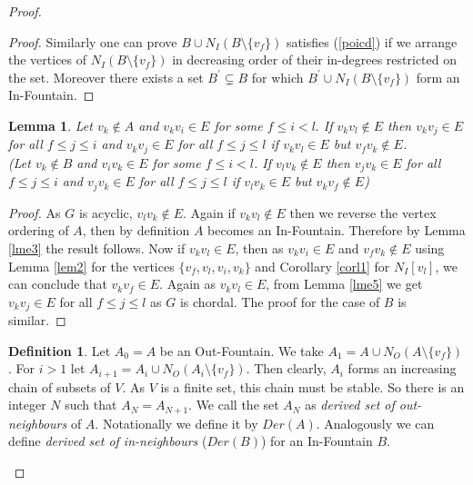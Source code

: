 \documentclass{article}
\newtheorem{lem}[thm]{Lemma}
\theoremstyle{definition}
\newtheorem{defn}[thm]{Definition}
\numberwithin{equation}{section}
\begin{document}
\begin{proof}
\begin{proof}
\noindent Similarly one can prove $B\cup N_{I}(B\setminus \{v_{f}\})$ satisfies (\ref{poicd}) if we arrange the vertices of $N_{I}(B\setminus \{v_{f}\})$ in decreasing order of their in-degrees restricted on the set. Moreover there exists a set $B^{'}\subsetneq B$ for which $B^{'}\cup N_{I}(B\setminus \{v_{f}\})$ form an In-Fountain. 
\end{proof}




\begin{lem}\label{lme7}
Let $v_{k}\notin A$ and $v_{k}v_{i}\in E$ for some $f\leq i<l.$ If $v_{k}v_{l}\notin E$ then $v_{k}v_{j}\in E$ for all $f\leq j\leq i$ and $v_{k}v_{j}\in E$ for all $f\leq j\leq l$ if $v_{k}v_{l}\in E$ but $v_{f}v_{k}\notin E$. \\
\vspace{0.2em}
\noindent (Let $v_{k}\notin B$ and $v_{i}v_{k}\in E$ for some $f\leq i<l$. If $v_{l}v_{k}\notin E$ then $v_{j}v_{k}\in E$ for all $f\leq j \leq i$ and $v_{j}v_{k}\in E$ for all $f\leq j \leq l$ if $v_{l}v_{k}\in E$ but $v_{k}v_{f}\notin E$)
\end{lem}


\begin{proof}
As $G$ is acyclic, $v_{l}v_{k}\notin E$. Again if $v_{k}v_{l}\notin E$ then 
we reverse the vertex ordering of $A$, then by definition $A$ becomes an In-Fountain. Therefore by Lemma \ref{lme3} the result follows.
Now if $v_{k}v_{l}\in E$, then as $v_{k}v_{i}\in E$ and $v_{f}v_{k}\notin E$ using Lemma \ref{lem2} for the vertices $\{v_{f},v_{l},v_{i},v_{k}\}$
and Corollary \ref{corl1} for $N_{I}[v_{l}]$, we can conclude that $v_{k}v_{f}\in E$. Again as $v_{k}v_{l}\in E$, from Lemma \ref{lme5} we get $v_{k}v_{j}\in E$ for all $f\leq j\leq l$ as $G$ is chordal.  The proof for the case of $B$ is similar.
\end{proof}



\begin{defn}
Let $A_{0}=A$ be an Out-Fountain. We take $A_{1}= A\cup N_{O}(A\setminus \{v_{f}\})$. For $i>1$ let $A_{i+1}= A_{i}\cup N_{O}(A_{i}\setminus \{v_{f}\})$.
Then clearly, $A_{i}$ forms an increasing chain of subsets of $V$. As $V$ is a finite set, this chain must be stable. So there is an integer $N$ such that $A_{N}=A_{N+1}$. We call the set $A_{N}$ as {\em derived set of out-neighbours}  of $A$. Notationally we define it by $Der(A)$. Analogously we can define {\em derived set of in-neighbours} ($Der(B)$) for an In-Fountain $B$.
\end{defn}


\end{proof}
\end{document}

